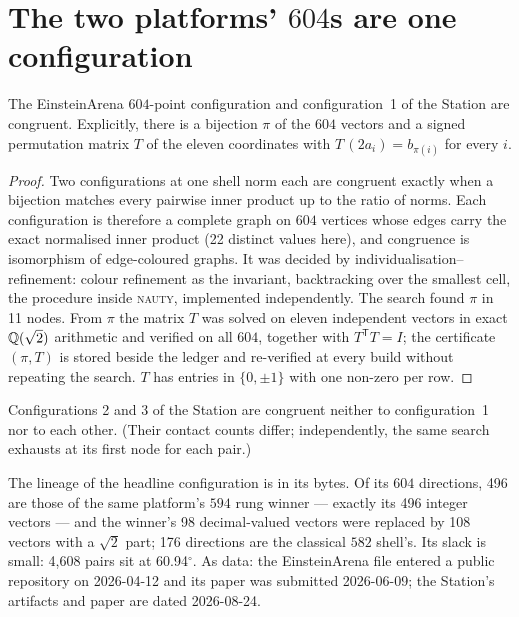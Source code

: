 \documentclass[11pt]{article}
\begin{document}
\section{The two platforms' $604$s are one configuration}

\begin{theorem}
The EinsteinArena $604$-point configuration and configuration~1 of the Station
are congruent. Explicitly, there is a bijection $\pi$ of the $604$ vectors and a
signed permutation matrix $T$ of the eleven coordinates with $T\,(2a_i) =
b_{\pi(i)}$ for every $i$.
\end{theorem}

\begin{proof}
Two configurations at one shell norm each are congruent exactly when a bijection
matches every pairwise inner product up to the ratio of norms. Each
configuration is therefore a complete graph on $604$ vertices whose edges carry
the exact normalised inner product (22 distinct
values here), and congruence is isomorphism of edge-coloured graphs. It was
decided by individualisation--refinement: colour refinement as the invariant,
backtracking over the smallest cell, the procedure inside \textsc{nauty},
implemented independently. The search found $\pi$ in
11 nodes. From $\pi$ the matrix $T$ was solved on
eleven independent vectors in exact $\mathbb{Q}(\sqrt2)$ arithmetic and verified on all
$604$, together with $T^{\mathsf T}T = I$; the certificate $(\pi, T)$ is stored
beside the ledger and re-verified at every build without repeating the search.
$T$ has entries in $\{0, \pm1\}$ with one non-zero per row.
\end{proof}

\begin{corollary}
Configurations 2 and 3 of the Station are congruent neither to configuration~1
nor to each other. (Their contact counts differ; independently, the same
search exhausts at its first node for each pair.)
\end{corollary}

\begin{remark}
The lineage of the headline configuration is in its bytes. Of its $604$
directions, 496 are those of the same
platform's $594$ rung winner --- exactly its 496 integer
vectors --- and the winner's 98 decimal-valued vectors were
replaced by 108 vectors with a
$\sqrt2$ part; 176 directions are
the classical $582$ shell's. Its slack is small: 4,608
pairs sit at 60.94$^\circ$. As data: the
EinsteinArena file entered a public repository on 2026-04-12 and its paper was
submitted 2026-06-09; the Station's artifacts and paper are dated 2026-08-24.
\end{remark}
\end{document}
